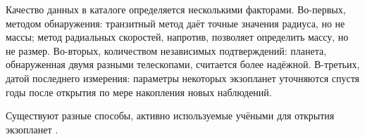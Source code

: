 \documentclass[14pt,a4paper]{extarticle}
\begin{document}
	Качество данных в каталоге определяется несколькими факторами. Во-первых, методом обнаружения: транзитный метод даёт точные значения радиуса, но не массы; метод радиальных скоростей, напротив, позволяет определить массу, но не размер. Во-вторых, количеством независимых подтверждений: планета, обнаруженная двумя разными телескопами, считается более надёжной. В-третьих, датой последнего измерения: параметры некоторых экзопланет уточняются спустя годы после открытия по мере накопления новых наблюдений.
	
	Существуют разные способы, активно используемые учёными для открытия экзопланет \cite{methods}. %
	
	\vspace{5pt}
	
\end{document}
